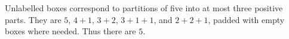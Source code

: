 Unlabelled boxes correspond to partitions of five into at most three positive parts. They are $5$, $4+1$, $3+2$, $3+1+1$, and $2+2+1$, padded with empty boxes where needed. Thus there are $\boxed5$.
